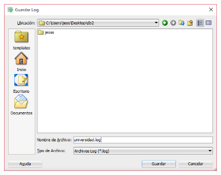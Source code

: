 \documentclass[a4paper,openright,12pt]{book}
\begin{document}
\begin{center}
\includegraphics[width=11cm]{./images/5-1 Ejercicio 2/8.png}\\
\end{center}
\end{document}
